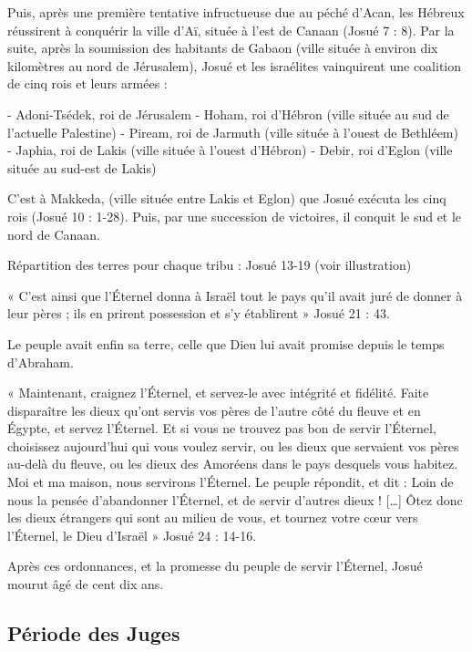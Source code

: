 Puis, après une première tentative infructueuse due au péché d'Acan, les Hébreux réussirent à conquérir la ville d'Aï, située à l'est de Canaan (Josué 7 : 8).
Par la suite, après la soumission des habitants de Gabaon (ville située à environ dix kilomètres au nord de Jérusalem), Josué et les israélites vainquirent une coalition de cinq rois et leurs armées :

- Adoni-Tsédek, roi de Jérusalem
- Hoham, roi d'Hébron (ville située au sud de l'actuelle Palestine)
- Piream, roi de Jarmuth (ville située à l'ouest de Bethléem)
- Japhia, roi de Lakis (ville située à l'ouest d'Hébron)
- Debir, roi d'Eglon (ville située au sud-est de Lakis)

C'est à Makkeda, (ville située entre Lakis et Eglon) que Josué exécuta les cinq rois (Josué 10 : 1-28). Puis, par une succession de victoires, il conquit le sud et le nord de Canaan.

Répartition des terres pour chaque tribu : Josué 13-19 (voir illustration)

« C'est ainsi que l’Éternel donna à Israël tout le pays qu'il avait juré de donner à leur pères ; ils en prirent possession et s'y établirent » Josué 21 : 43.

Le peuple avait enfin sa terre, celle que Dieu lui avait promise depuis le temps d'Abraham.

« Maintenant, craignez l’Éternel, et servez-le avec intégrité et fidélité. Faite disparaître les dieux qu'ont servis vos pères de l'autre côté du fleuve et en Égypte, et servez l’Éternel. Et si vous ne trouvez pas bon de servir l’Éternel, choisissez aujourd'hui qui vous voulez servir, ou les dieux que servaient vos pères au-delà du fleuve, ou les dieux des Amoréens dans le pays desquels vous habitez. Moi et ma maison, nous servirons l’Éternel. Le peuple répondit, et dit : Loin de nous la pensée d'abandonner l’Éternel, et de servir d'autres dieux ! […] Ôtez donc les dieux étrangers qui sont au milieu de vous, et tournez votre cœur vers l’Éternel, le Dieu d'Israël » Josué 24 : 14-16.

Après ces ordonnances, et la promesse du peuple de servir l’Éternel, Josué mourut âgé de cent dix ans.

\subsection*{Période des Juges}

